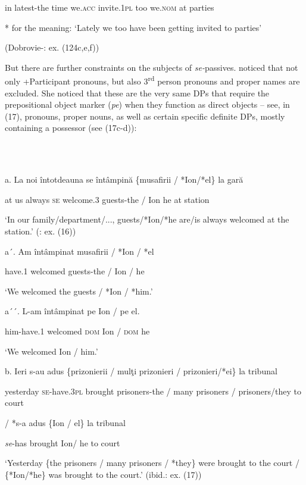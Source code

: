 \documentclass[output=paper]{langsci/langscibook}
\begin{document}
              in latest-the time   we.\textsc{acc}  invite.\textsc{1pl}  too we.\textsc{nom} at parties

             * for the meaning: ‘Lately we too have been getting invited to parties’

    (Dobrovie-\citealt{Sorin2017}: ex. (124c,e,f))

But there are further constraints on the subjects of \textit{se-}passives. \citet{Cornilescu1998} noticed that not only +Participant pronouns, but also 3\textsuperscript{rd} person pronouns and proper names are excluded. She noticed that these are the very same DPs that require the prepositional object marker (\textit{pe}) when they function as direct objects – see, in (17), pronouns, proper nouns, as well as certain specific definite DPs, mostly containing a possessor (see (17c-d)):

\ea%
    \label{ex:key:17}
    \gll\\
        \\
    \glt
    \z

          a.   La noi întotdeauna se întâmpină  \{musafirii / *Ion/*el\} la gară  

      at us    always        \textsc{se} welcome.3   guests-the / Ion   he  at station

‘In our family/department/..., guests/*Ion/*he are/is always welcomed at the station.’ (\citealt{Cornilescu1998}: ex. (16))

a´.   Am     întâmpinat musafirii / *Ion / *el 

       have.1 welcomed guests-the / Ion / he         

       ‘We welcomed  the guests / *Ion / *him.’

a´´.   L-am          întâmpinat pe   Ion  / pe    el. 

        him-have.1 welcomed \textsc{dom} Ion / \textsc{dom} he

        ‘We welcomed  Ion / him.’

b.   Ieri          s-au              adus    \{prizonierii   / mulţi prizonieri / prizonieri/*ei\}  la tribunal

yesterday \textsc{se}{}-have.3\textsc{pl} brought prisoners-the / many prisoners / prisoners/they  to court

     / *s-a       adus     \{Ion / el\} la tribunal       

         \textit{se}{}-has brought  Ion/   he  to court

‘Yesterday  \{the prisoners / many prisoners / *they\} were brought to the court / \{*Ion/*he\} was brought to the court.’ (ibid.: ex. (17))
\end{document}
